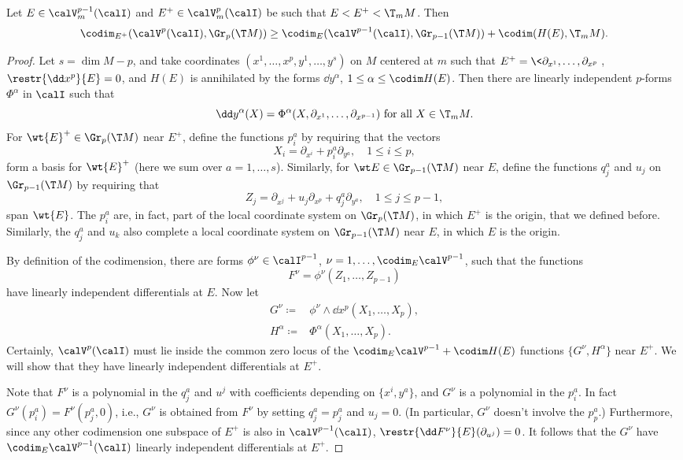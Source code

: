 \begin{lem}
    Let $E\in\calV^{p-1}_m(\calI)$ and $E^+\in \calV^p_m(\calI)$ be such that $E<E^+<\T_m M$. Then 
    \[\codim_{E^+}(\calV^p(\calI),\Gr_p(\T M))\geq \codim_E(\calV^{p-1}(\calI),\Gr_{p-1}(\T M))+\codim(H(E),\T_m M).\]
\end{lem}
\begin{proof}
    Let $s=\dim M-p$, and take coordinates $(x^1,\ldots,x^p,y^1,\ldots,y^s)$ on $M$ centered at $m$ such that $E^+=\<\partial_{x^1},\ldots,\partial_{x^p}\>$, $\restr{\dd x^p}{E}=0$, and $H(E)$ is annihilated by the forms $\dd y^\alpha$, $1\leq\alpha\leq \codim H(E)$. Then there are linearly independent $p$-forms $\Phi^\alpha$ in $\calI$ such that 
    \[\dd y^\alpha(X)=\Phi^\alpha(X,\partial_{x^1},\ldots,\partial_{x^{p-1}})\text{ for all }X\in\T_m M.\label{eq 8.4 Ivey}\]
    For $\wt{E}^+\in\Gr_p(\T M)$ near $E^+$, define the functions $p^a_i$ by requiring that the vectors 
    \[X_i=\partial_{x^i}+p^a_i\partial_{y^a},\quad 1\leq i\leq p,\]
    form a basis for $\wt{E}^+$ (here we sum over $a=1,\ldots,s$). Similarly, for $\wt E\in\Gr_{p-1}(\T M)$ near $E$, define the functions $q^a_j$ and $u_j$ on $\Gr_{p-1}(\T M)$ by requiring that 
    \[Z_j=\partial_{x^j}+u_j\partial_{x^p}+q^a_j\partial_{y^a},\quad 1\leq j\leq p-1,\]
    span $\wt{E}$. The $p^a_i$ are, in fact, part of the local coordinate system on $\Gr_p(\T M)$, in which $E^+$ is the origin, that we defined before. Similarly, the $q^a_j$ and $u_k$ also complete a local coordinate system on $\Gr_{p-1}(\T M)$ near $E$, in which $E$ is the origin.

    By definition of the codimension, there are forms $\phi^\nu\in\calI^{p-1}$, $\nu=1,\ldots,\codim_E\calV^{p-1}$, such that the functions 
    \[F^\nu=\phi^\nu(Z_1,\ldots,Z_{p-1})\]
    have linearly independent differentials at $E$. Now let 
    \begin{align}
        G^\nu\coloneqq &\phi^\nu\wedge\dd x^p(X_1,\ldots,X_p),\\
        H^\alpha\coloneqq &\Phi^\alpha(X_1,\ldots,X_p).
    \end{align}
    Certainly, $\calV^p(\calI)$ must lie inside the common zero locus of the $\codim_E\calV^{p-1}+\codim H(E)$ functions $\{G^\nu,H^\alpha\}$ near $E^+$. We will show that they have linearly independent differentials at $E^+$.

    Note that $F^\nu$ is a polynomial in the $q^a_j$ and $u^j$ with coefficients depending on $\{x^i,y^a\}$, and $G^\nu$ is a polynomial in the $p^a_i$. In fact $G^\nu(p^a_i)=F^\nu(p^a_j,0)$, i.e., $G^\nu$ is obtained from $F^\nu$ by setting $q^a_j=p^a_j$ and $u_j=0$. (In particular, $G^\nu$ doesn't involve the $p^a_p$.) Furthermore, since any other codimension one subspace of $E^+$ is also in $\calV^{p-1}(\calI)$, $\restr{\dd F^\nu}{E}(\partial_{u^j})=0$. It follows that the $G^\nu$ have $\codim_E \calV^{p-1}(\calI)$ linearly independent differentials at $E^+$.


\end{proof}

